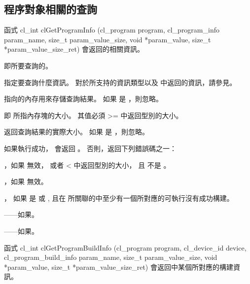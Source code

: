 \subsection{程序對象相關的查詢}

函式
\startclc
cl_int clGetProgramInfo (cl_program program,
			cl_program_info param_name,
			size_t param_value_size,
			void *param_value,
			size_t *param_value_size_ret)
\stopclc
會返回的相關資訊。

 即所要查詢的。

 指定要查詢什麼資訊。
對於所支持的資訊類型以及  中返回的資訊，請參見。

 指向的內存用來存儲查詢結果。
如果  是 ，則忽略。

 即  所指內存塊的大小。
其值必須 >= 中返回型別的大小。

 返回查詢結果的實際大小。
如果  是 ，則忽略。


如果執行成功， 會返回 。
否則，返回下列錯誤碼之一：
\startigBase
\item {}，如果  無效，
或者  < 中返回型別的大小，
且  不是 。

\item {}，如果  無效。

\item {}，
如果  是  或 ,
且在  所關聯的中至少有一個所對應的可執行沒有成功構建。

\item {}——如果\scdevfailres。

\item {}——如果\schostfailres。
\stopigBase

函式
\startclc
cl_int clGetProgramBuildInfo (cl_program program,
			cl_device_id device,
			cl_program_build_info param_name,
			size_t param_value_size,
			void *param_value,
			size_t *param_value_size_ret)
\stopclc
會返回中某個所對應的構建資訊。

